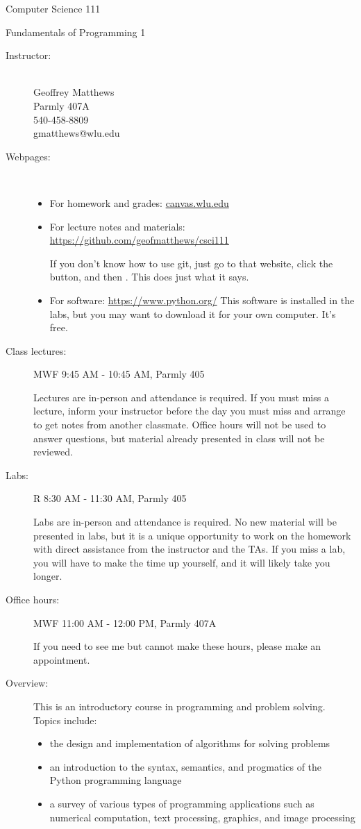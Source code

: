 \documentclass[12pt]{article}
\begin{document}
\centerline{\Large Computer Science 111}
\centerline{\large Fundamentals of Programming 1}

\begin{description}
\item[Instructor:]
~\\ Geoffrey Matthews
\\ Parmly 407A
\\ 540-458-8809
\\ gmatthews@wlu.edu
\item[Webpages:]~
\begin{itemize}
\item For homework and grades: \url{canvas.wlu.edu}
\item For lecture notes and materials: 
\url{https://github.com/geofmatthews/csci111}

If you don't know how to use git, just go to that website,
click the  button, and then .
This does just what it says.
\item For software: \url{https://www.python.org/}
This software is installed in the labs, but you may want to
download it for your own computer.  It's free.

\end{itemize}
\item[Class lectures:]  MWF 9:45 AM - 10:45 AM, Parmly 405

Lectures are in-person and attendance is required.  If you must miss a
lecture, inform your instructor before the day you must miss
and arrange to get notes from another classmate.  Office hours
will not be used to answer questions, but material already presented
in class will not be reviewed.

\item[Labs:]  R 8:30 AM - 11:30 AM,  Parmly 405

Labs are in-person and attendance is required.
No new material will be presented in labs, but it is a 
unique opportunity to work on the homework with direct 
assistance from the instructor and the TAs.  If you miss
a lab, you will have to make the time up yourself, and it
will likely take you longer.

\item[Office hours:] MWF  11:00 AM - 12:00 PM, Parmly 407A

If you need to see me but
cannot make these hours, please  make an appointment.

\item[Overview:]
This is an introductory course in programming and problem
solving.  Topics include:
\begin{itemize}
\item the design and implementation of algorithms for solving problems
\item an introduction to the syntax, semantics, 
and progmatics of the Python programming language
\item a survey of various types of programming applications such as
numerical computation, text processing, graphics, and image processing
\end{itemize}
 

\end{description}
\end{document}
